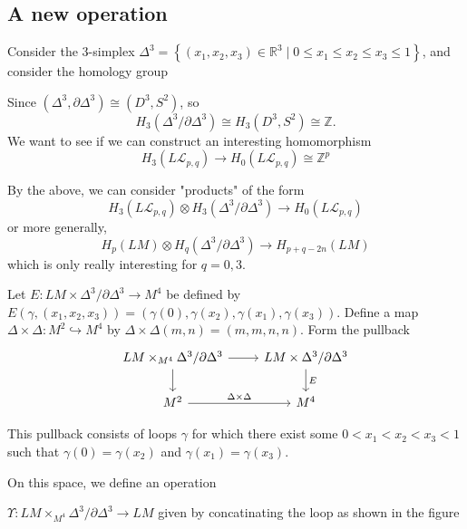 \documentclass[reqno]{amsart}
\theoremstyle{definition}
\theoremstyle{remark}
\begin{document}
\newpage

\subsection{A new operation}


Consider the $3$-simplex
$\Delta^3 = \left\{ \left( x_1,x_2,x_3 \right) \in \mathbb{R}^3  \mid 
0 \le x_1 \le x_2 \le x_3 \le 1\right\} $, and
consider the homology group

Since $\left( \Delta^3, \partial \Delta^3 \right) 
\cong \left( D^3, S^2 \right) $,
so
\[
H_3 \left( \Delta^3 / \partial \Delta^3 \right) \cong
H_3 \left( D^3, S^2 \right) \cong
\mathbb{Z}.
\] 
We want to see if we can construct an interesting
homomorphism
\[
H_3 \left( L \mathcal{L}_{p,q} \right) \to 
H_0 \left( L \mathcal{L}_{p,q} \right) 
\cong \mathbb{Z}^{p}
\] 

By the above, we can consider "products" of the form
\[
H_3 \left( L \mathcal{L}_{p,q} \right) \otimes
H_3 \left( \Delta^3 / \partial \Delta^3 \right) 
\to H_0 \left( L \mathcal{L}_{p,q} \right) 
\] 
or more generally,
\[
H_p \left( LM \right) \otimes
H_q \left( \Delta^3 / \partial \Delta^3 \right) \to 
H_{p+q-2n}\left( LM \right) 
\] 
which is only really interesting for
$q = 0,3$.\\
\linebreak




Let $E \colon
LM \times \Delta^3 / \partial \Delta^3 \to 
M^{4}$ be defined by
$E\left(\gamma, \left( x_1,x_2,x_3 \right)  \right) = 
\left( \gamma(0), \gamma(x_2), \gamma(x_1),
\gamma(x_3)\right)  $. Define
a map $\Delta \times \Delta\colon M^2 \hookrightarrow M^{4}$ by
$\Delta \times \Delta \left( m,n \right) = 
\left( m,m,n,n \right) $.
Form the pullback
\begin{equation*}
\begin{tikzcd}
    LM \times_{M^{4}} \Delta^3 / \partial \Delta^3
    \ar[r] \ar[d] & LM \times \Delta^3 / \partial \Delta^3
    \ar[d, "E"] \\
    M^2 \ar[r, "\Delta \times \Delta"] & M^{4}
\end{tikzcd}
\end{equation*}

This pullback consists of loops $\gamma$ for which
there exist some
$0 < x_1 < x_2 < x_3 < 1$ such that
$\gamma (0) = \gamma(x_2)$ and
$\gamma(x_1) = \gamma(x_3)$.

On this space, we define an operation

$\Upsilon \colon LM \times_{M^{4}} \Delta^3 / \partial \Delta^3 \to 
LM$ given by
concatinating the loop as shown in the figure
\end{document}
